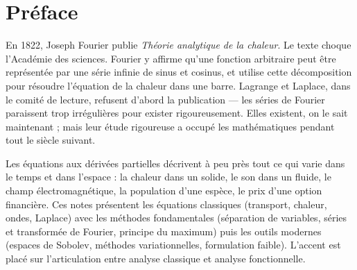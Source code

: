 \documentclass[12pt,a4paper,twoside]{book}
\theoremstyle{definition}
\theoremstyle{plain}
\theoremstyle{remark}
\begin{document}
\begin{titlepage}
\end{titlepage}

\frontmatter
\tableofcontents


\chapter*{Pr\'eface}

En 1822, Joseph Fourier publie \emph{Th\'eorie analytique de la chaleur}. Le texte choque l'Acad\'emie des sciences. Fourier y affirme qu'une fonction arbitraire peut \^etre repr\'esent\'ee par une s\'erie infinie de sinus et cosinus, et utilise cette d\'ecomposition pour r\'esoudre l'\'equation de la chaleur dans une barre. Lagrange et Laplace, dans le comit\'e de lecture, refusent d'abord la publication --- les s\'eries de Fourier paraissent trop irr\'eguli\`eres pour exister rigoureusement. Elles existent, on le sait maintenant ; mais leur \'etude rigoureuse a occup\'e les math\'ematiques pendant tout le si\`ecle suivant.

\medskip

Les \'equations aux d\'eriv\'ees partielles d\'ecrivent \`a peu pr\`es tout ce qui varie dans le temps et dans l'espace : la chaleur dans un solide, le son dans un fluide, le champ \'electromagn\'etique, la population d'une esp\`ece, le prix d'une option financi\`ere. Ces notes pr\'esentent les \'equations classiques (transport, chaleur, ondes, Laplace) avec les m\'ethodes fondamentales (s\'eparation de variables, s\'eries et transform\'ee de Fourier, principe du maximum) puis les outils modernes (espaces de Sobolev, m\'ethodes variationnelles, formulation faible). L'accent est plac\'e sur l'articulation entre analyse classique et analyse fonctionnelle.
\end{document}
